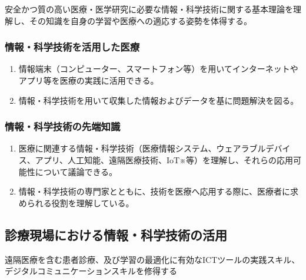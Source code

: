 \documentclass[
]{ltjsarticle}
\providecommand{\tightlist}{%
  \setlength{\itemsep}{0pt}\setlength{\parskip}{0pt}}
\begin{document}
安全かつ質の高い医療・医学研究に必要な情報・科学技術に関する基本理論を理解し、その知識を自身の学習や医療への適応する姿勢を体得する。

\hypertarget{ux60c5ux5831ux79d1ux5b66ux6280ux8853ux3092ux6d3bux7528ux3057ux305fux533bux7642}{%
\subsubsection{情報・科学技術を活用した医療}\label{ux60c5ux5831ux79d1ux5b66ux6280ux8853ux3092ux6d3bux7528ux3057ux305fux533bux7642}}

\begin{enumerate}
\def\labelenumi{\arabic{enumi}.}
\tightlist
\item
  情報端末（コンピューター、スマートフォン等）を用いてインターネットやアプリ等を医療の実践に活用できる。
\item
  情報・科学技術を用いて収集した情報およびデータを基に問題解決を図る。
\end{enumerate}

\hypertarget{ux60c5ux5831ux79d1ux5b66ux6280ux8853ux306eux5148ux7aefux77e5ux8b58}{%
\subsubsection{情報・科学技術の先端知識}\label{ux60c5ux5831ux79d1ux5b66ux6280ux8853ux306eux5148ux7aefux77e5ux8b58}}

\begin{enumerate}
\def\labelenumi{\arabic{enumi}.}
\tightlist
\item
  医療に関連する情報・科学技術（医療情報システム、ウェアラブルデバイス、アプリ、人工知能、遠隔医療技術、IoT※等）を理解し、それらの応用可能性について議論できる。
\item
  情報・科学技術の専門家とともに、技術を医療へ応用する際に、医療者に求められる役割を理解している。
\end{enumerate}

\hypertarget{ux8a3aux7642ux73feux5834ux306bux304aux3051ux308bux60c5ux5831ux79d1ux5b66ux6280ux8853ux306eux6d3bux7528}{%
\subsection{診療現場における情報・科学技術の活用}\label{ux8a3aux7642ux73feux5834ux306bux304aux3051ux308bux60c5ux5831ux79d1ux5b66ux6280ux8853ux306eux6d3bux7528}}

遠隔医療を含む患者診療、及び学習の最適化に有効なICTツールの実践スキル、デジタルコミュニケーションスキルを修得する
\end{document}
